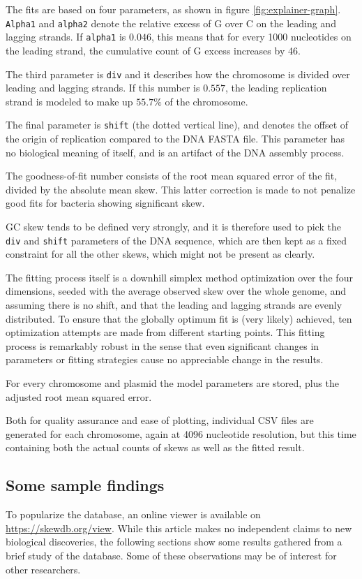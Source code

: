 \documentclass[fleqn,10pt]{wlscirep}
\begin{document}
The fits are based on four parameters, as shown in figure \ref{fig:explainer-graph}. {\tt Alpha1} and {\tt alpha2} denote the relative excess of G over C on the leading and lagging strands. If {\tt alpha1} is $0.046$, this means that for every 1000 nucleotides on the leading strand, the cumulative count of G excess increases by 46.

The third parameter is {\tt div} and it describes how the chromosome is divided over leading and lagging strands. If this number is $0.557$, the leading replication strand is modeled to make up $55.7\%$ of the chromosome.

The final parameter is {\tt shift} (the dotted vertical line), and denotes the offset of the origin of replication compared to the DNA FASTA file. This parameter has no biological meaning of  itself, and is an artifact of the DNA assembly process. 

The goodness-of-fit number consists of the root mean squared error of the fit, divided by the absolute mean skew. This latter correction is made to not penalize good fits for bacteria showing significant skew.

GC skew tends to be defined very strongly, and it is therefore used to pick the {\tt div} and {\tt shift} parameters of the DNA sequence, which are then kept as a fixed constraint for all the other skews, which might not be present as clearly.

The fitting process itself is a downhill simplex method optimization\cite{Nelder1965} over the four dimensions, seeded with the average observed skew over the whole genome, and assuming there is no shift, and that the leading and lagging strands are evenly distributed. To ensure that the globally optimum fit is (very likely) achieved, ten optimization attempts are made from different starting points. This fitting process is remarkably robust in the sense that even significant changes in parameters or fitting strategies cause no appreciable change in the results. 

For every chromosome and plasmid the model parameters are stored, plus the adjusted root mean squared error.

Both for quality assurance and ease of plotting, individual CSV files are generated for each chromosome, again at 4096 nucleotide resolution, but this time containing both the actual counts of skews as well as the fitted result.
  
\subsection*{Some sample findings}
To popularize the database, an online viewer is available on \url{https://skewdb.org/view}. While this article makes no independent claims to new biological discoveries, the following sections show some results gathered from a brief study of the database. Some of these observations may be of interest for other researchers.
\end{document}
